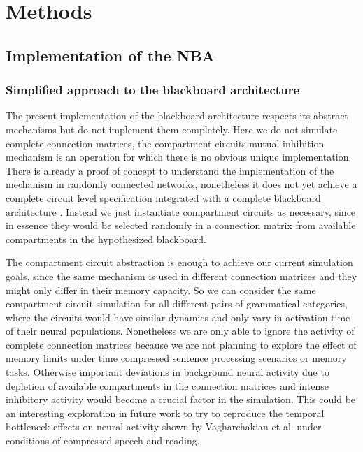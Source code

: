 \documentclass[10pt]{article}
\begin{document}
\section{Methods}

{\label{488128}}

\subsection{Implementation of the
  NBA}\label{implementation-of-the-nba}

\subsubsection{Simplified approach to the blackboard
  architecture}\label{simplified-approach-to-the-blackboard-architecture}

The present implementation of the blackboard architecture respects its
abstract mechanisms but do not implement them completely. Here we do
not simulate complete connection matrices, the compartment circuits
mutual inhibition mechanism is an operation for which there is no
obvious unique implementation. There is already a proof of concept to
understand the implementation of the mechanism in randomly connected
networks, nonetheless it does not yet achieve a complete circuit level
specification integrated with a complete blackboard architecture
\cite{van_der_Velde_2011}. Instead we just instantiate compartment
circuits as necessary, since in essence they would be selected
randomly in a connection matrix from available compartments in the
hypothesized blackboard.

The compartment circuit abstraction is enough to achieve our current
simulation goals, since the same mechanism is used in different
connection matrices and they might only differ in their memory
capacity. So we can consider the same compartment circuit simulation
for all different pairs of grammatical categories, where the circuits
would have similar dynamics and only vary in activation time of their
neural populations. Nonetheless we are only able to ignore the
activity of complete connection matrices because we are not planning
to explore the effect of memory limits under time compressed sentence
processing scenarios or memory tasks. Otherwise important deviations
in background neural activity due to depletion of available
compartments in the connection matrices and intense inhibitory
activity would become a crucial factor in the simulation. This could
be an interesting exploration in future work to try to reproduce the
temporal bottleneck effects on neural activity shown by Vagharchakian
et al. under conditions of compressed speech and
reading\cite{Vagharchakian_2012}.
\end{document}

